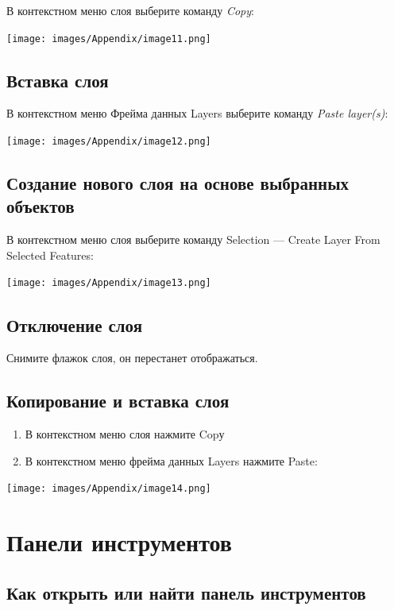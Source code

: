 \documentclass[12pt,]{book}
\begin{document}
В контекстном меню слоя выберите команду \emph{Copy}:

\texttt{[image: images/Appendix/image11.png]}

\hypertarget{section-15}{%
\section{Вставка слоя}\label{section-15}}

В контекстном меню Фрейма данных Layers выберите команду \emph{Paste layer(s)}:

\texttt{[image: images/Appendix/image12.png]}

\hypertarget{section-16}{%
\section{Создание нового слоя на основе выбранных объектов}\label{section-16}}

В контекстном меню слоя выберите команду Selection --- Create Layer From Selected Features:

\texttt{[image: images/Appendix/image13.png]}

\hypertarget{section-17}{%
\section{Отключение слоя}\label{section-17}}

Снимите флажок слоя, он перестанет отображаться.

\hypertarget{section-18}{%
\section{Копирование и вставка слоя}\label{section-18}}

\begin{enumerate}
\def\labelenumi{\arabic{enumi}.}
\item
  В контекстном меню слоя нажмите Copу
\item
  В контекстном меню фрейма данных Layers нажмите Paste:
\end{enumerate}

\texttt{[image: images/Appendix/image14.png]}

\hypertarget{manual-toolbar}{%
\chapter{Панели инструментов}\label{manual-toolbar}}

\hypertarget{section-19}{%
\section{Как открыть или найти панель инструментов}\label{section-19}}
\end{document}
